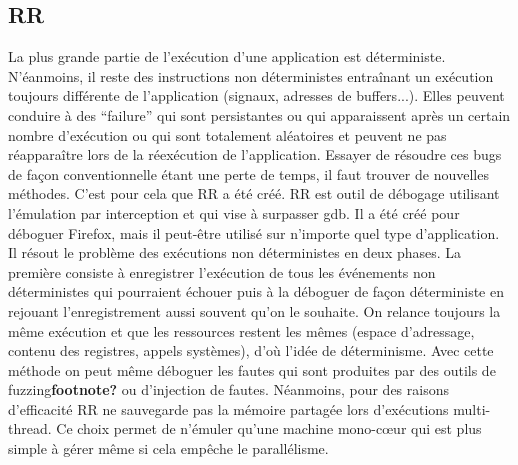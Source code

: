 \subsection{RR}

La plus grande partie de l'exécution d'une application est déterministe. N'éanmoins, il reste des instructions non déterministes entraînant un exécution toujours différente de l'application  (signaux, adresses de buffers...). Elles peuvent conduire à des ``failure''  qui sont persistantes ou qui apparaissent après un certain nombre d'exécution ou qui sont totalement aléatoires et peuvent ne pas réapparaître lors de la réexécution de l'application. Essayer de résoudre ces bugs de façon conventionnelle étant une perte de temps, il faut trouver de nouvelles méthodes. C'est pour cela que RR a été créé. RR \citep{RR} est outil de débogage utilisant l'émulation par interception et qui vise à surpasser gdb. Il a été créé pour déboguer Firefox, mais il peut-être utilisé sur n'importe quel type d'application. Il résout le problème des exécutions non déterministes en deux phases. La première consiste à enregistrer l'exécution de tous les événements non déterministes qui pourraient échouer puis à la déboguer de façon déterministe en rejouant l'enregistrement aussi souvent qu'on le souhaite. On relance toujours la même exécution et que les ressources restent les mêmes (espace d'adressage, contenu des registres, appels systèmes), d'où l'idée de déterminisme. Avec cette méthode on peut même déboguer les fautes qui sont produites par des outils de fuzzing\textbf{footnote?} ou d'injection de fautes. Néanmoins, pour des raisons d'efficacité RR ne sauvegarde pas la mémoire partagée lors d'exécutions multi-thread. Ce choix permet de n'émuler qu'une machine mono-c\oe ur qui est plus simple à gérer même si cela empêche le parallélisme.

